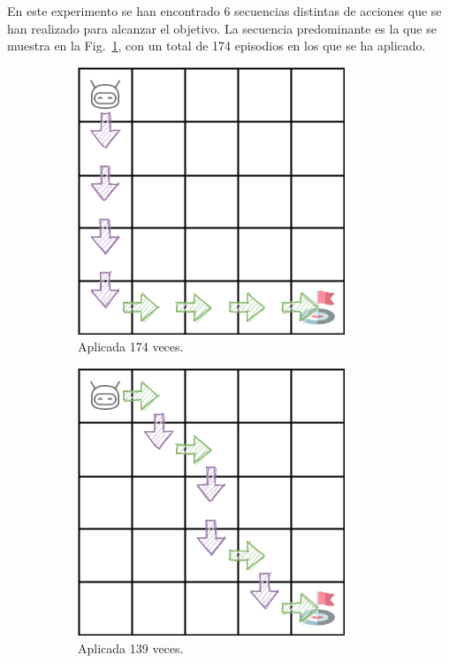 En este experimento se han encontrado 6 secuencias distintas de acciones que se han realizado para alcanzar el objetivo. La secuencia predominante es la que se muestra en la Fig.~\ref{fig:dim5_lr0.01_ep0.7_174}, con un total de 174 episodios en los que se ha aplicado. \\
\begin{figure}
    \centering
    \begin{subfigure}{.3\textwidth}
        \centering
        \includegraphics[scale=0.35]{cap5_experimentacion/images/dim5_lr0.01_ep0.7_174.png}
        \caption{Aplicada 174 veces.}
        \label{fig:dim5_lr0.01_ep0.7_174}
    \end{subfigure}%
    \begin{subfigure}{.3\textwidth}
        \centering
        \includegraphics[scale=0.35]{cap5_experimentacion/images/dim5_lr0.01_ep0.7_139.png}
        \caption{Aplicada 139 veces.}
        \label{fig:dim5_lr0.01_ep0.7_139}
    \end{subfigure}%
    \begin{subfigure}{.3\textwidth}

\end{subfigure}
\end{figure}
